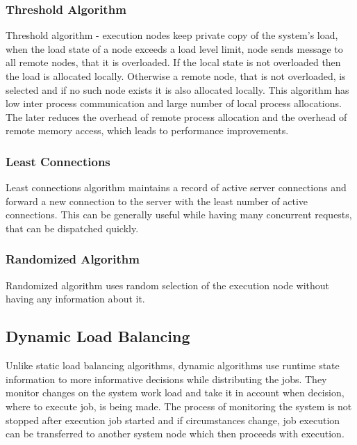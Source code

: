 \subsubsection{Threshold Algorithm}
Threshold algorithm - execution nodes keep private copy of the system's load, when the load state of a node exceeds a load level limit,
node sends message to all remote nodes, that it is overloaded.
If the local state is not overloaded then the load is allocated locally.
Otherwise a remote node, that is not overloaded, is selected and if no such node exists it is also allocated locally.
This algorithm has low inter process communication and large number of local process allocations.
The later reduces the overhead of remote process allocation and the overhead of remote memory access,
which leads to performance improvements\cite{web:staticAndDynamicLoadBalancing}.

\subsubsection{Least Connections}
Least connections algorithm maintains a record of active server connections
and forward a new connection to the server with the least number of active connections\cite{web:ibmLoadBalancingDecisions}.
This can be generally useful while having many concurrent requests, that can be dispatched quickly.

\subsubsection{Randomized Algorithm}
Randomized algorithm uses random selection of the execution node without having any information about it.

\subsection{Dynamic Load Balancing}\label{subsec:dynamic-load-balancing}
Unlike static load balancing algorithms, dynamic algorithms use runtime state information to more informative decisions while distributing the jobs.
They monitor changes on the system work load and take it in account when decision, where to execute job, is being made.
The process of monitoring the system is not stopped after execution job started and if circumstances change,
job execution can be transferred to another system node which then proceeds with execution.

